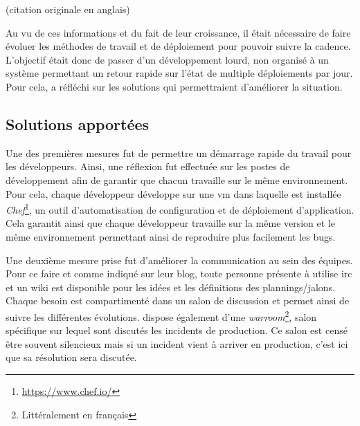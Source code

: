 \epigraph{}{ \cite{etsyInterview} (citation originale en anglais)}

Au vu de ces informations et du fait de leur croissance, il était nécessaire de faire évoluer les méthodes de travail et de déploiement pour pouvoir suivre la cadence. L'objectif était donc de passer d'un développement lourd, non organisé à un système permettant un retour rapide sur l'état de multiple déploiements par jour. Pour cela, \etsy{} a réfléchi sur les solutions qui permettraient d'améliorer la situation. 

\subsection{Solutions apportées}

Une des premières mesures fut de permettre un démarrage rapide du travail pour les développeurs. Ainsi, une réflexion fut effectuée sur les postes de développement afin de garantir que chacun travaille sur le même environnement. Pour cela, chaque développeur développe sur une \gls{vm} dans laquelle est installée \emph{Chef}\footnote{\url{https://www.chef.io/}}, un outil d'automatisation de configuration et de déploiement d'application. Cela garantit ainsi que chaque développeur travaille sur la même version et le même environnement permettant ainsi de reproduire plus facilement les bugs. 

\epigraph{}{ \cite{etsyManageDevOps}}

Une deuxième mesure prise fut d'améliorer la communication au sein des équipes. Pour ce faire et comme indiqué sur leur blog, toute personne présente à \etsy{} utilise \gls{irc} et un wiki est disponible pour les idées et les définitions des plannings/jalons. Chaque besoin est compartimenté dans un salon de discussion et permet ainsi de suivre les différentes évolutions. \etsy{} dispose également d'une \emph{warroom}\footnote{Littéralement  en français}, salon spécifique sur lequel sont discutés les incidents de production. Ce salon est censé être souvent silencieux mais si un incident vient à arriver en production, c'est ici que sa résolution sera discutée.

